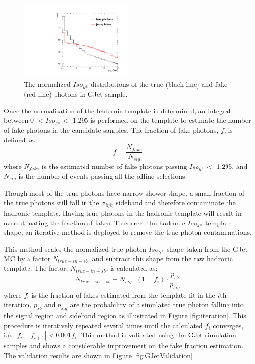 \documentclass[thesis.tex]{subfiles}
\renewcommand\_{\textunderscore\allowbreak}
\begin{document}
\begin{figure}[hbtp]
  \centering
    \includegraphics[width=0.5\textwidth]{Figures/PLOT_JetPhoTemplate.pdf}
  \caption{The normalized $Iso_{h^\pm}$ distributions of the true (black line) and fake (red line) photons in GJet sample.}
    \label{fig:fakeinGJet}
\end{figure}

Once the normalization of the hadronic template is determined, an integral between 0 $< Iso_{h^\pm} <$ 1.295 is performed on the template to estimate the number of fake photons in the candidate samples. The fraction of fake photons, $f$, is defined as: 
\begin{equation}
		f = \frac{N_{fake}}{N_{sig}}
\end{equation}
where $N_{fake}$ is the estimated number of fake photons passing $Iso_{h^\pm} < $ 1.295, and $N_{sig}$ is the number of events passing all the offline selections. 

Though most of the true photons have narrow shower shape, a small fraction of the true photons still fall in the $\sigma_{i\eta i\eta}$ sideband and therefore contaminate the hadronic template. Having true photons in the hadronic template will result in overestimating the fraction of fakes. To correct the hadronic $Iso_{h^\pm}$ template shape, an iterative method is deployed to remove the true photon contaminations.

This method scales the normalized true photon $Iso_{h^\pm}$ shape taken from the GJet MC by a factor $N_{true-in-sb}$, and subtract this shape from the raw hadronic template. The factor, $N_{true-in-sb}$,  is calculated as:
\begin{equation}
		N_{true-in-sb} = N_{sig} \cdot (1-f_i) \cdot \frac{p_{sb}}{p_{sig}}
\end{equation}
where $f_i$ is the fraction of fakes estimated from the template fit in the $i$th iteration, $p_{sb}$ and $p_{sig}$ are the probability of a simulated true photon falling into the signal region and sideband region as illustrated in Figure \ref{fig:iteration}. This procedure is iteratively repeated several times until the calculated $f_i$ converges, i.e. $|f_i - f_{i+1}| < 0.001f_i$. This method is validated using the GJet simulation samples and shows a considerable improvement on the fake fraction estimation. The validation results are shown in Figure \ref{fig:GJetValidation} .
\end{document}
